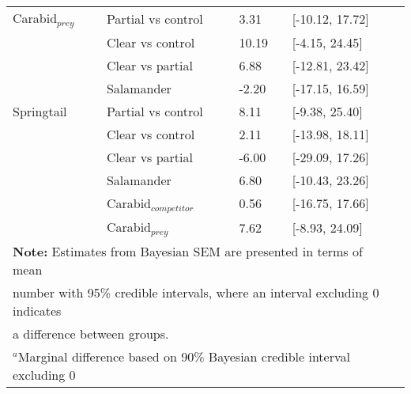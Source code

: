 \begin{table}[ht!]
\begin{tabular}{lllll}
      Carabid$_{prey}$    & Partial vs control & \hspace{1mm}3.31 & [-10.12, 17.72] \\
                          & Clear vs control  & \hspace{1mm}10.19 & [-4.15, 24.45] \\ 
                          & Clear vs partial  & \hspace{1mm}6.88 & [-12.81, 23.42] \\  
                          & Salamander        & -2.20 & [-17.15, 16.59] \\  
      Springtail         & Partial vs control & \hspace{1mm}8.11 & [-9.38, 25.40] \\
                          & Clear vs control  & \hspace{1mm}2.11 & [-13.98, 18.11] \\ 
                          & Clear vs partial  & -6.00 & [-29.09, 17.26] \\  
                          & Salamander        & \hspace{1mm}6.80 & [-10.43, 23.26] \\ 
                          & Carabid$_{competitor}$      & \hspace{1mm}0.56 & [-16.75, 17.66] \\ 
                          & Carabid$_{prey}$      & \hspace{1mm}7.62 & [-8.93, 24.09] \\ 
      \hline
      \multicolumn{4}{l}{\textbf{Note:} Estimates from Bayesian SEM are presented in terms of mean} \\
      \multicolumn{4}{l}{number with 95\% credible intervals, where an interval excluding 0 indicates} \\
      \multicolumn{4}{l}{a difference between groups.} \\
      \multicolumn{4}{l}{$^{a}$Marginal difference based on 90\% Bayesian credible interval excluding 0}
  \end{tabular}
\end{table}


